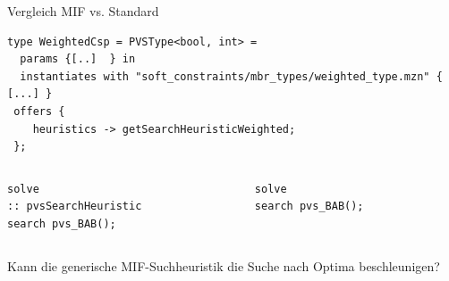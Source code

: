 \begin{frame}[fragile]{Vergleich MIF vs. Standard}
\vspace*{2ex}

\begin{lstlisting}
type WeightedCsp = PVSType<bool, int> = 
  params {[..]  } in  
  instantiates with "soft_constraints/mbr_types/weighted_type.mzn" { [...] }
 offers {
    heuristics -> getSearchHeuristicWeighted;
 };
 \end{lstlisting}

\begin{columns}[onlytextwidth]
    \begin{column}{.45\textwidth}
    \centering {}

    \vspace*{1ex}

\begin{lstlisting}
solve 
:: pvsSearchHeuristic
search pvs_BAB();
\end{lstlisting}
    \end{column}
    \begin{column}{.45\textwidth}
    \centering {}

    \vspace*{1ex}
    \begin{lstlisting}
solve 
search pvs_BAB();
\end{lstlisting}
    \end{column}
\end{columns}
\begin{parchment}[Evaluationsfrage]
Kann die generische MIF-Suchheuristik die Suche nach Optima beschleunigen?
\end{parchment}
\end{frame}


